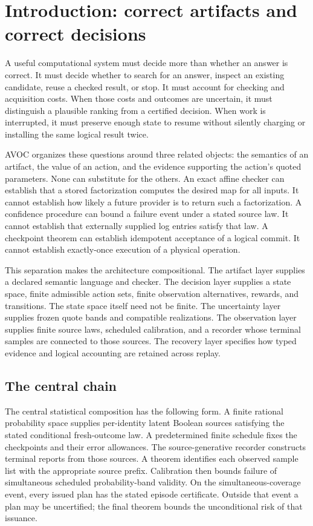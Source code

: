 \tableofcontents
\clearpage

\section{Introduction: correct artifacts and correct decisions}
\label{sec:intro}
A useful computational system must decide more than whether an answer is correct. It must decide whether to search for an answer, inspect an existing candidate, reuse a checked result, or stop. It must account for checking and acquisition costs. When those costs and outcomes are uncertain, it must distinguish a plausible ranking from a certified decision. When work is interrupted, it must preserve enough state to resume without silently charging or installing the same logical result twice.

AVOC organizes these questions around three related objects: the semantics of an artifact, the value of an action, and the evidence supporting the action's quoted parameters. None can substitute for the others. An exact affine checker can establish that a stored factorization computes the desired map for all inputs. It cannot establish how likely a future provider is to return such a factorization. A confidence procedure can bound a failure event under a stated source law. It cannot establish that externally supplied log entries satisfy that law. A checkpoint theorem can establish idempotent acceptance of a logical commit. It cannot establish exactly-once execution of a physical operation.

This separation makes the architecture compositional. The artifact layer supplies a declared semantic language and checker. The decision layer supplies a state space, finite admissible action sets, finite observation alternatives, rewards, and transitions. The state space itself need not be finite. The uncertainty layer supplies frozen quote bands and compatible realizations. The observation layer supplies finite source laws, scheduled calibration, and a recorder whose terminal samples are connected to those sources. The recovery layer specifies how typed evidence and logical accounting are retained across replay.

\subsection{The central chain}
The central statistical composition has the following form. A finite rational probability space supplies per-identity latent Boolean sources satisfying the stated conditional fresh-outcome law. A predetermined finite schedule fixes the checkpoints and their error allowances. The source-generative recorder constructs terminal reports from those sources. A theorem identifies each observed sample list with the appropriate source prefix. Calibration then bounds failure of simultaneous scheduled probability-band validity. On the simultaneous-coverage event, every issued plan has the stated episode certificate. Outside that event a plan may be uncertified; the final theorem bounds the unconditional risk of that issuance.

